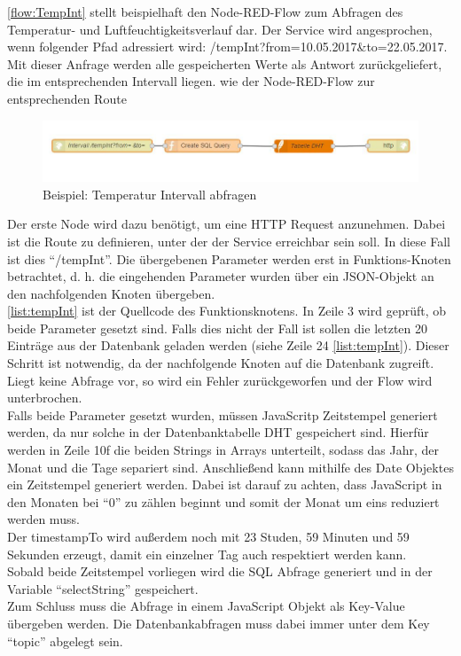 \autoref{flow:TempInt} stellt beispielhaft den Node-RED-Flow zum Abfragen des Temperatur- und Luftfeuchtigkeitsverlauf dar. Der Service wird angesprochen, wenn folgender Pfad adressiert wird: /tempInt?from=10.05.2017\&to=22.05.2017. Mit dieser Anfrage werden alle gespeicherten Werte als Antwort zurückgeliefert, die im entsprechenden Intervall liegen. wie der Node-RED-Flow zur entsprechenden Route 

\begin{figure}[h]
	\centering
	\includegraphics[scale=0.7]{images/tempIntFlow}
	\caption{Beispiel: Temperatur Intervall abfragen}
	\label{flow:TempInt}
\end{figure}
Der erste Node wird dazu benötigt, um eine HTTP Request anzunehmen. Dabei ist die Route zu definieren, unter der der Service erreichbar sein soll. In diese Fall ist dies \enquote{/tempInt}. Die übergebenen Parameter werden erst in Funktions-Knoten betrachtet, d. h. die eingehenden Parameter wurden über ein JSON-Objekt an den nachfolgenden Knoten übergeben. 
\\\autoref{list:tempInt} ist der Quellcode des Funktionsknotens. In Zeile 3 wird geprüft, ob beide Parameter gesetzt sind. Falls dies nicht der Fall ist sollen die letzten 20 Einträge aus der Datenbank geladen werden (siehe Zeile 24 \autoref{list:tempInt}). Dieser Schritt ist notwendig, da der nachfolgende Knoten auf die Datenbank zugreift. Liegt keine Abfrage vor, so wird ein Fehler zurückgeworfen und der Flow wird unterbrochen. 
\\Falls beide Parameter gesetzt wurden, müssen JavaScritp Zeitstempel generiert werden, da nur solche in der Datenbanktabelle DHT gespeichert sind. Hierfür werden in Zeile 10f die beiden Strings in Arrays unterteilt, sodass das Jahr, der Monat und die Tage separiert sind. Anschließend kann mithilfe des Date Objektes ein Zeitstempel generiert werden. Dabei ist darauf zu achten, dass JavaScript in den Monaten bei \enquote{0} zu zählen beginnt und somit der Monat um eins reduziert werden muss. \\Der timestampTo wird außerdem noch mit 23 Studen, 59 Minuten und 59 Sekunden erzeugt, damit ein einzelner Tag auch respektiert werden kann. \\Sobald beide Zeitstempel vorliegen wird die \ac{SQL} Abfrage generiert und in der Variable \enquote{selectString} gespeichert. \\Zum Schluss muss die Abfrage in einem JavaScript Objekt als Key-Value übergeben werden. Die Datenbankabfragen muss dabei immer unter dem Key \enquote{topic} abgelegt sein.  
